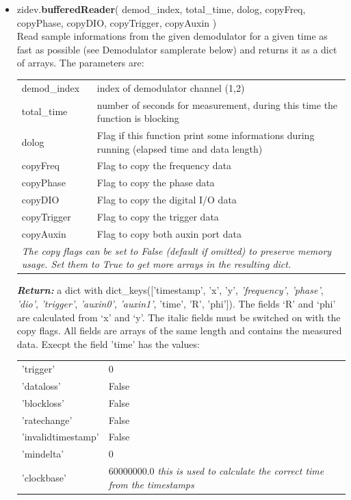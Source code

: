 \documentclass[11pt]{article} %
\begin{document}
\begin{itemize}
\item zidev.{\bf bufferedReader}( demod\_index, total\_time, dolog, copyFreq, copyPhase, copyDIO, copyTrigger, copyAuxin ) \\
	Read sample informations from the given demodulator for a given time as fast as possible (see Demodulator samplerate below) and returns it as a dict of arrays. The parameters are:
	\setlength{\LTleft}{1cm}
	\begin{longtable}{p{3.1cm}p{12cm}}
	demod\_index & index of demodulator channel (1,2) \\
	total\_time  & number of seconds for measurement, during this time the function is blocking \\
	dolog & Flag if this function print some informations during running (elapsed time and data length) \\
	copyFreq & Flag to copy the frequency data \\
	copyPhase & Flag to copy the phase data \\
	copyDIO & Flag to copy the digital I/O data \\
	copyTrigger & Flag to copy the trigger data \\
	copyAuxin & Flag to copy both auxin port data \\
	\multicolumn{2}{p{15cm}}{\it The copy flags can be set to False (default if omitted) to preserve memory usage. Set them to True to get more arrays in the resulting dict.} \\
	\end{longtable}
	\textbf{\textit{Return:}} a dict with dict\_keys(['timestamp', 'x', 'y', {\it 'frequency'}, {\it 'phase'}, {\it 'dio'}, {\it 'trigger'}, {\it 'auxin0'}, {\it 'auxin1'}, 'time', 'R', 'phi']).
	The fields `R' and `phi' are calculated from `x' and `y'. The italic fields must be switched on with the copy flags. All fields are arrays of the same length and contains the measured data. Execpt the field 'time' has the values:
	\begin{longtable}{p{3.1cm}p{12cm}}
	'trigger' & 0 \\
	'dataloss' & False \\
	'blockloss' & False \\
	'ratechange' & False \\
	'invalidtimestamp' & False \\
	'mindelta' & 0 \\
	'clockbase' & 60000000.0  {\it this is used to calculate the correct time from the timestamps} \\
	\end{longtable}


\end{itemize}
\end{document}
